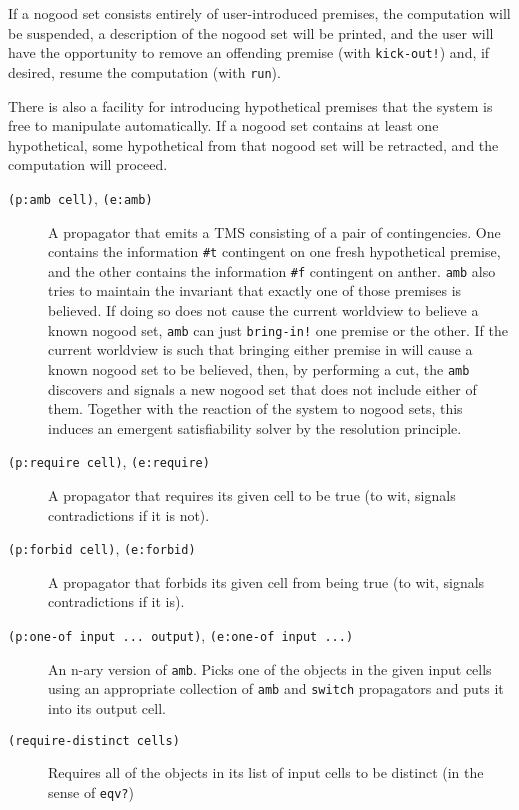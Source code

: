 \documentclass[12pt,letterpaper,english]{article}
\begin{document}
If a nogood set consists entirely of user-introduced premises, the
computation will be suspended, a description of the nogood set will be
printed, and the user will have the opportunity to remove an offending
premise (with \texttt{kick-out!}) and, if desired, resume the computation
(with \texttt{run}).

There is also a facility for introducing hypothetical premises that
the system is free to manipulate automatically.  If a nogood set
contains at least one hypothetical, some hypothetical from that nogood
set will be retracted, and the computation will proceed.
\begin{description}
\item[{\texttt{(p:amb cell)}, \texttt{(e:amb)}}] \leavevmode 
A propagator that emits a TMS consisting of a pair of contingencies.
One contains the information \texttt{{\#}t} contingent on one fresh
hypothetical premise, and the other contains the information \texttt{{\#}f}
contingent on anther.  \texttt{amb} also tries to maintain the invariant
that exactly one of those premises is believed.  If doing so
does not cause the current worldview to believe a known nogood set,
\texttt{amb} can just \texttt{bring-in!} one premise or the other.  If the current
worldview is such that bringing either premise in will cause a known
nogood set to be believed, then, by performing a cut, the \texttt{amb}
discovers and signals a new nogood set that does not include either
of them.  Together with the reaction of the system to nogood sets,
this induces an emergent satisfiability solver by the resolution
principle.

\item[{\texttt{(p:require cell)}, \texttt{(e:require)}}] \leavevmode 
A propagator that requires its given cell to be true (to wit,
signals contradictions if it is not).

\item[{\texttt{(p:forbid cell)}, \texttt{(e:forbid)}}] \leavevmode 
A propagator that forbids its given cell from being true (to wit,
signals contradictions if it is).

\item[{\texttt{(p:one-of input ... output)}, \texttt{(e:one-of input ...)}}] \leavevmode 
An n-ary version of \texttt{amb}.  Picks one of the objects in the given
input cells using an appropriate collection of \texttt{amb} and
\texttt{switch} propagators and puts it into its output cell.

\item[{\texttt{(require-distinct cells)}}] \leavevmode 
Requires all of the objects in its list of input cells to be
distinct (in the sense of \texttt{eqv?})

\end{description}
\end{document}

